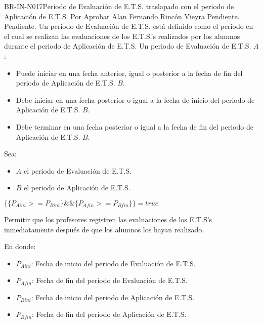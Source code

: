 \begin{BusinessRule}{BR-IN-N017}{Periodo de Evaluación de E.T.S. traslapado con el periodo de Aplicación de E.T.S.}
	{\bcAutorization}  %
	{\btEnabler}    %
	{\blControlling}    %
	\BRItem[Estado] Por Aprobar
	 Alan Fernando Rincón Vieyra
	 Pendiente.
	 Pendiente.
	\BRItem[Descripción] Un periodo de Evaluación de E.T.S. está definido como el periodo en el cual se realizan las evaluaciones de los E.T.S.'s realizados por los alumnos durante el periodo de Aplicación de E.T.S. Un periodo de Evaluación de E.T.S. $A$:
	\begin{itemize}
		\item Puede iniciar en una fecha anterior, igual o posterior a la fecha de fin del periodo de Aplicación de E.T.S. $B$.
		\item Debe iniciar en una fecha posterior o igual a la fecha de inicio del periodo de Aplicación de E.T.S. $B$.
		\item Debe terminar en una fecha posterior o igual a la fecha de fin del periodo de Aplicación de E.T.S. $B$.
	\end{itemize}
	
	\BRItem[Sentencia] Sea:
	\begin{itemize}
		\item $A$ el periodo de Evaluación de E.T.S.
		\item $B$ el periodo de Aplicación de E.T.S.
	\end{itemize}
	
	\begin{center}
		$ \{
		\{P_{Aini} >= P_{Bini}\} \&\&
		\{P_{Afin} >= P_{Bfin}\}
		\} = true$ 
	\end{center}
	
	\BRItem[Motivación] Permitir que los profesores registren las evaluaciones de los E.T.S's inmediatamente después de que los alumnos los hayan realizado.
	
	En donde:
	\begin{itemize}
		\item $P_{Aini}$: Fecha de inicio del periodo de Evaluación de E.T.S.
		\item $P_{Afin}$: Fecha de fin del periodo de Evaluación de E.T.S.
		\item $P_{Bini}$: Fecha de inicio del periodo de Aplicación de E.T.S.
		\item $P_{Bfin}$: Fecha de fin del periodo de Aplicación de E.T.S.
	\end{itemize} 
	

\end{BusinessRule}
